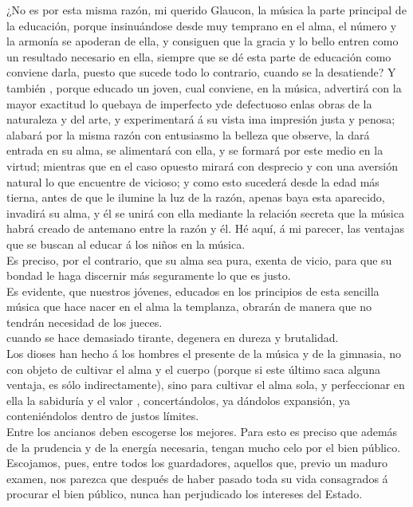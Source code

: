 \documentclass[10pt]{book}
\begin{document}
 ¿No es por esta misma razón, mi querido Glaucon, la música la parte principal de la educación, porque insinuándose desde muy temprano en el alma, el número y la armonía se apoderan de ella, y consiguen que la gracia y lo bello entren como un resultado necesario en ella, siempre que se dé esta parte de educación como conviene darla, puesto que sucede todo lo contrario, cuando se la desatiende? Y también , porque educado un joven, cual conviene, en la música, advertirá con la mayor exactitud lo quebaya de imperfecto yde defectuoso enlas obras de la naturaleza y del arte, y experimentará á su vista ima impresión justa y penosa; alabará por la misma razón con entusiasmo la belleza que observe, la dará entrada en su alma, se alimentará con ella, y se formará por este medio en la virtud; mientras que en el caso opuesto mirará con desprecio y con una aversión natural lo que encuentre de vicioso; y como esto sucederá desde la edad más tierna, antes de que le ilumine la luz de la razón, apenas baya esta aparecido, invadirá su alma, y él se unirá con ella mediante la relación secreta que la música habrá creado de antemano entre la razón y él. Hé aquí, á mi parecer, las ventajas que se buscan al educar á los niños en la música. \\
Es preciso, por el contrario, que su alma sea pura, exenta de vicio, para que su bondad le haga discernir más seguramente lo que es justo.\\
Es evidente, que nuestros jóvenes, educados en los principios de esta sencilla música que hace nacer en el alma la templanza, obrarán de manera que no tendrán necesidad de los jueces. \\
cuando se hace demasiado tirante, degenera en dureza y brutalidad.\\
 Los dioses han hecho á los hombres el presente de la música y de la gimnasia, no con objeto de cultivar el alma y el cuerpo (porque si este último saca alguna ventaja, es sólo indirectamente), sino para cultivar el alma sola, y perfeccionar en ella la sabiduría y el valor , concertándolos, ya dándolos expansión, ya conteniéndolos dentro de justos límites.\\
Entre los ancianos deben escogerse los mejores. Para esto es preciso que además de la prudencia y de la energía necesaria, tengan mucho celo por el bien público. Escojamos, pues, entre todos los guardadores, aquellos que, previo un maduro examen, nos parezca que después de haber pasado toda su vida consagrados á procurar el bien público, nunca han perjudicado los intereses del Estado. \\
\end{document}
